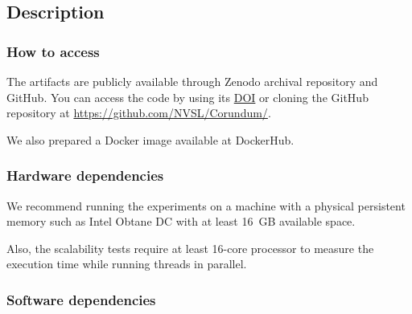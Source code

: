 {%
\subsection{Description}

\subsubsection{How to access}

The artifacts are publicly available
through Zenodo archival repository and GitHub. You can access the code by using its \href{https://zenodo.org/record/4321062}{DOI} or cloning the GitHub repository at \href{https://github.com/NVSL/Corundum/}{https://github.com/NVSL/Corundum/}.

We also prepared a Docker image available at DockerHub.

\subsubsection{Hardware dependencies}

We recommend running the experiments on a machine with a physical persistent memory such as Intel Obtane DC with at least 16~GB available space.

Also, the scalability tests require at least 16-core processor to measure the execution time while running threads in parallel.

\subsubsection{Software dependencies}

}
